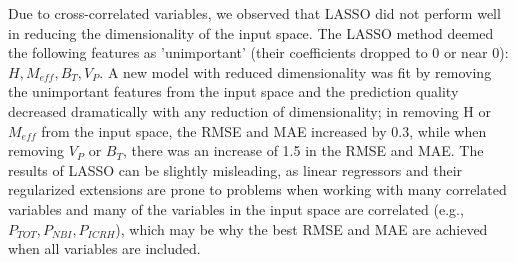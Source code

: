 \documentclass[a4paper, twoside, final, 12pt]{article}
\begin{document}
{Due to cross-correlated variables, we observed that LASSO did not perform well in reducing the dimensionality of the input space. The LASSO method deemed the following features as 'unimportant' (their coefficients dropped to 0 or near 0): $H, M_{eff}, B_T, V_P$. A new model with reduced dimensionality was fit by removing the unimportant features from the input space and the prediction quality decreased dramatically with any reduction of dimensionality; in removing H or $M_{eff}$ from the input space, the RMSE and MAE increased by 0.3, while when removing $V_P$ or $B_T$, there was an increase of 1.5 in the RMSE and MAE. 
The results of LASSO can be slightly misleading, as linear regressors and their regularized extensions are prone to problems when working with many correlated variables and many of the variables in the input space are correlated (e.g., $P_{TOT}, P_{NBI}, P_{ICRH}$), which may be why the best RMSE and MAE are achieved when all variables are included.


}
\end{document}
